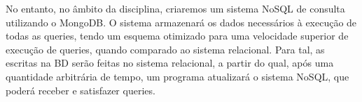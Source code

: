 No entanto, no âmbito da disciplina, criaremos um sistema NoSQL de consulta utilizando o MongoDB. O sistema armazenará os dados necessários à execução de todas as queries, tendo um esquema otimizado para uma velocidade superior de execução de queries, quando comparado ao sistema relacional. Para tal, as escritas na BD serão feitas no sistema relacional, a partir do qual, após uma quantidade arbitrária de tempo, um programa atualizará o sistema NoSQL, que poderá receber e satisfazer queries.
